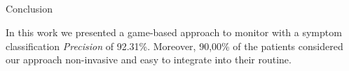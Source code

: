 \documentclass{beamer}
\begin{document}
\subsection{}
\begin{frame}{Conclusion}
	\begin{block}{}
	In this work we presented a game-based approach to monitor with a symptom classification \textit{Precision} of 92.31\%. Moreover, 90,00\% of the patients considered our approach non-invasive and easy to integrate into their routine. 
	\end{block}
\end{frame}
%
%   
%			        
%
%
%
\end{document}
